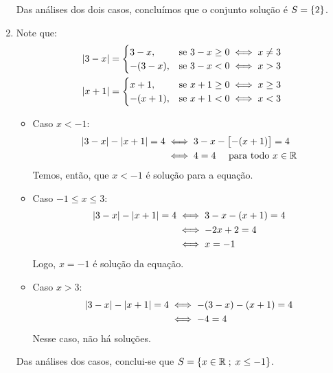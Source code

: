 \begin{solution}
\begin{enumerate}
	Das análises dos dois casos, concluímos que o conjunto solução é $S=\left\{2\right\}$.

	\item Note que:
	\begin{align*}
		& \left|3-x\right|= 
		\begin{cases}
			3-x,    & \text{se } 3-x \ge 0 \iff x \ne 3 \\
			-(3-x), & \text{se } 3-x < 0 \iff x > 3
		\end{cases}\\
		& \left|x+1\right|= 
		\begin{cases}
			x+1,    & \text{se } x+1 \ge 0 \iff x \ge 3 \\
			-(x+1), & \text{se } x+1 < 0 \iff x < 3
		\end{cases}
	\end{align*}
	\begin{itemize}
		\item Caso $x<-1$: 
		\begin{align*}
			\left|3-x\right|-\left|x+1\right|=4 &\iff 3-x-\left[-(x+1)\right]=4\\
									&\iff 4=4 \ \ \ \text{ para todo } x \in \mathbb{R}
		\end{align*}
		Temos, então, que $x<-1$ é solução para a equação.
		\item Caso $-1 \le x \le 3$:
		\begin{align*}
			\left|3-x\right|-\left|x+1\right|=4 &\iff 3-x-(x+1)=4\\
									&\iff -2x+2=4\\
									&\iff x=-1
		\end{align*}
		Logo, $x=-1$ é solução da equação.
		\item Caso $x>3$:
		\begin{align*}
			\left|3-x\right|-\left|x+1\right|=4 &\iff -(3-x)-(x+1)=4\\
									&\iff -4=4
		\end{align*}
		Nesse caso, não há soluções.
	\end{itemize}

	Das análises dos casos, conclui-se que $S=\left\{x \in \mathbb{R} \;;\; x \le -1\right\}$.
\end{enumerate}
\end{solution}

